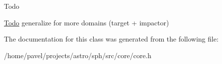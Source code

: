 \begin{DoxyRefDesc}{Todo}
\item[\hyperlink{todo__todo000001}{Todo}]generalize for more domains (target + impactor) \end{DoxyRefDesc}


The documentation for this class was generated from the following file\+:\begin{DoxyCompactItemize}
\item 
/home/pavel/projects/astro/sph/src/core/core.\+h\end{DoxyCompactItemize}
